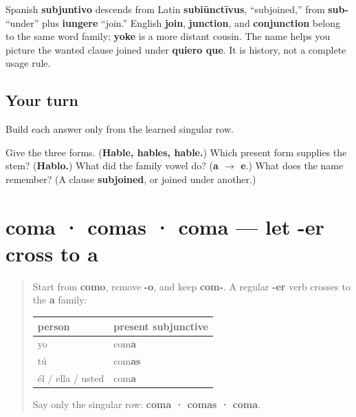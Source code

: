 \begin{cousinweb}
Spanish \textbf{subjuntivo} descends from Latin \textbf{subiūnctīvus}, “subjoined,” from \textbf{sub-} “under” plus \textbf{iungere} “join.” English \textbf{join}, \textbf{junction}, and \textbf{conjunction} belong to the same word family; \textbf{yoke} is a more distant cousin. The name helps you picture the wanted clause joined under \textbf{quiero que}. It is history, not a complete usage rule.
\end{cousinweb}

\subsection*{Your turn}
Build each answer only from the learned singular row.

\begin{tcolorbox}[breakable,colback=teal!4,colframe=teal!35!black,title={Before you move on}]
Give the three forms. (\textbf{Hable, hables, hable.}) Which present form supplies the stem? (\textbf{Hablo.}) What did the family vowel do? (\textbf{a $\to$ e}.) What does the name remember? (A clause \textbf{subjoined}, or joined under another.)
\end{tcolorbox}
\section[coma · comas · coma]{coma · comas · coma — let -er cross to a}

\label{lesson:ES-C18-comer-subjuntivo}



\begin{quote}
Start from \textbf{como}, remove \textbf{-o}, and keep \textbf{com-}. A regular \textbf{-er} verb crosses to the \textbf{a} family:

\noindent
\begin{tabularx}{\linewidth}{@{}>{\raggedright\arraybackslash}X>{\raggedright\arraybackslash}X@{}}
\toprule
\textbf{person} & \textbf{present subjunctive} \\
\midrule
yo & com\textbf{a} \\
tú & com\textbf{as} \\
él / ella / usted & com\textbf{a} \\
\bottomrule
\end{tabularx}

Say only the singular row: \textbf{coma · comas · coma}.
\end{quote}

